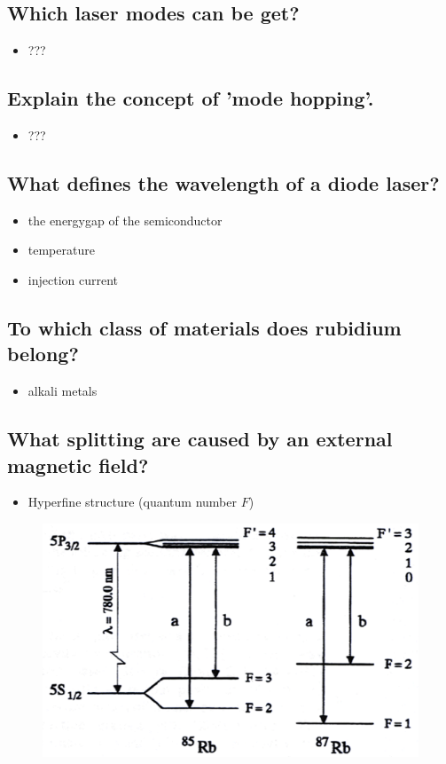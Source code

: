 \subsection{Which laser modes can be get?}
\begin{itemize}
    \item ???
\end{itemize}
\subsection{Explain the concept of 'mode hopping'.}
\begin{itemize}
    \item ???
\end{itemize}
\subsection{What defines the wavelength of a diode laser?}
\begin{itemize}
    \item the energygap of the semiconductor
    \item temperature
    \item injection current
\end{itemize}
\subsection{To which class of materials does rubidium belong?}
\begin{itemize}
    \item alkali metals
\end{itemize}
\subsection{What splitting are caused by an external magnetic field?}
\begin{itemize}
    \item Hyperfine structure (quantum number $F$)
\end{itemize}
\begin{figure}
    \includegraphics{pictures/Zeeman.png}
\end{figure}
